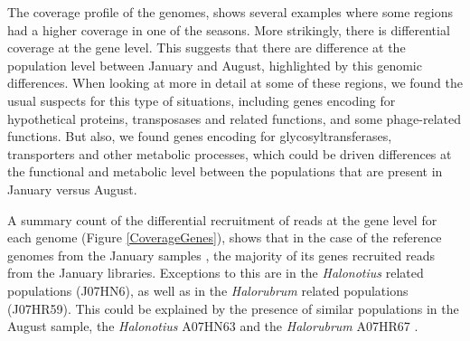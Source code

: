 The coverage profile of the genomes, shows several examples where some regions had a higher coverage in one of the seasons. More strikingly, there is differential coverage at the gene level. This suggests that there are difference at the population level between January and August, highlighted by this genomic differences. When looking at more in detail at some of these regions, we found the usual suspects for this type of situations, including genes encoding for hypothetical proteins, transposases and related functions, and some phage-related functions. But also, we found genes encoding for glycosyltransferases, transporters and other metabolic processes, which could be driven differences at the functional and metabolic level between the populations that are present in January versus August.

A summary count of the differential recruitment of reads at the gene level for each genome (Figure \ref{CoverageGenes}), shows that in the case of the reference genomes from the January samples \cite{Podell:2013kx}, the majority of its genes recruited reads from the January libraries. Exceptions to this are in the \textit{Halonotius} related populations (J07HN6), as well as in the \textit{Halorubrum} related populations (J07HR59). This could be explained by the presence of similar populations in the August sample, the \textit{Halonotius} A07HN63 and the \textit{Halorubrum} A07HR67 \cite{Podell:2013fp}.





%
%
%


